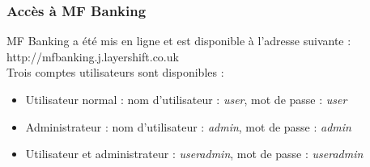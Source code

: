 \subsubsection{Accès à MF Banking}

MF Banking a été mis en ligne et est disponible à l'adresse suivante : http://mfbanking.j.layershift.co.uk \\
Trois comptes utilisateurs sont disponibles : 
\begin{itemize}
	\item Utilisateur normal : nom d'utilisateur : \textit{user}, mot de passe : \textit{user}
	\item Administrateur : nom d'utilisateur : \textit{admin}, mot de passe : \textit{admin}
	\item Utilisateur et administrateur : \textit{useradmin}, mot de passe : \textit{useradmin}
\end{itemize}
